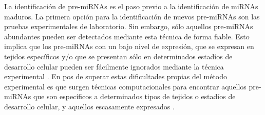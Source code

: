 La identificación de pre-miRNAs es el paso previo a la identificación
de miRNAs maduros. La primera opción para la identificación de nuevos
pre-miRNAs son las pruebas experimentales de laboratorio. Sin embargo,
sólo aquellos pre-miRNAs abundantes pueden ser detectados mediante
esta técnica de forma fiable. Esto implica que los pre-miRNAs con un
bajo nivel de expresión, que se expresan en tejidos específicos y/o
que se presentan sólo en determinados estadíos de desarrollo celular
pueden ser fácilmente ignorados mediante la técnica experimental
\cite{ding}\cite{xu}. En pos de superar estas dificultades propias del
método experimental es que surgen técnicas computacionales para
encontrar aquellos pre-miRNAs que son específicos a determinados tipos
de tejidos o estadíos de desarrollo celular, y aquellos escasamente
expresados \cite{sheng}\cite{xu}.